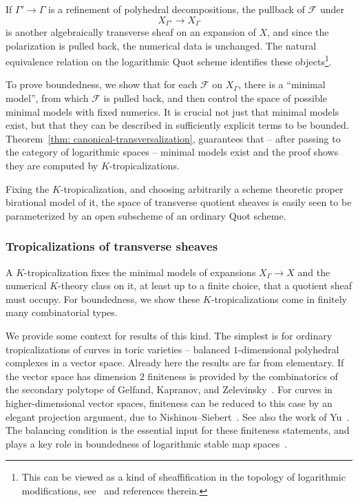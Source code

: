 \documentclass[11pt]{amsart}
\theoremstyle{definition}
\theoremstyle{definition}
\begin{document}
If $\Gamma'\to \Gamma$ is a refinement of polyhedral decompositions, the pullback of $\mathcal F$ under
\[
X_{\Gamma'}\to X_\Gamma
\]
is another algebraically transverse sheaf on an expansion of $X$, and since the polarization is pulled back, the numerical data is unchanged. The natural equivalence relation on the logarithmic Quot scheme identifies these objects\footnote{This can be viewed as a kind of sheaffification in the topology of logarithmic modifications, see~\cite{Nak17,MW23} and references therein.}. 

To prove boundedness, we show that for each $\mathcal F$ on $X_\Gamma$, there is a ``minimal model'', from which $\mathcal F$ is pulled back, and then control the space of possible minimal models with fixed numerics. It is crucial not just that minimal models exist, but that they can be described in sufficiently explicit terms to be bounded. Theorem~\ref{thm: canonical-transversalization}, guarantees that -- after passing to the category of logarithmic spaces -- minimal models exist and the proof shows they are computed by $K$-tropicalizations. 

Fixing the $K$-tropicalization, and choosing arbitrarily a scheme theoretic proper birational model of it, the space of transverse quotient sheaves is easily seen to be parameterized by an open subscheme of an ordinary Quot scheme. 

\subsubsection{Tropicalizations of transverse sheaves} A $K$-tropicalization fixes the minimal models of expansions $X_\Gamma\to X$ and the numerical $K$-theory class on it, at least up to a finite choice, that a quotient sheaf must occupy. For boundedness, we show these $K$-tropicalizations come in finitely many combinatorial types. 

We provide some context for results of this kind. The simplest is for ordinary tropicalizations of curves in toric varieties -- balanced $1$-dimensional polyhedral complexes in a vector space. Already here the results are far from elementary. If the vector space has dimension $2$ finiteness is provided by the combinatorics of the secondary polytope of Gelfand, Kapranov, and Zelevinsky~\cite{GKZ,Mi03}. For curves in higher-dimensional vector spaces, finiteness can be reduced to this case by an elegant projection argument, due to Nishinou--Siebert~\cite{NishSieb06}. See also the work of Yu~\cite{Yu14}.  The balancing condition is the essential input for these finiteness statements, and plays a key role in boundedness of logarithmic stable map spaces~\cite{ACMW17,gross2012logarithmic}.
\end{document}

